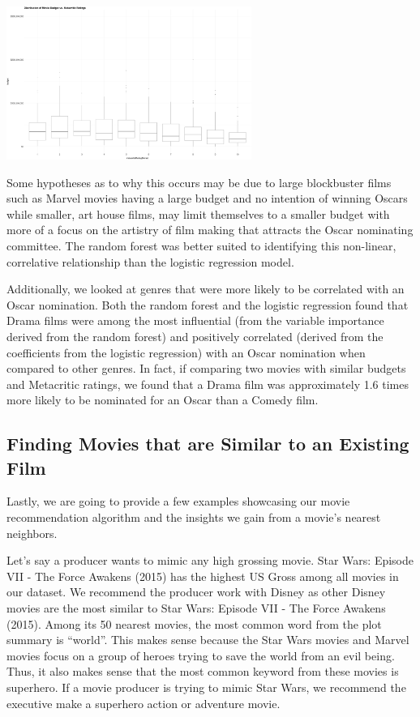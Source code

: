 \documentclass[10pt]{article}
\begin{document}
\begin{center}
\includegraphics[width=8cm]{_assets/_eda/eda__boxplot_budget_vs_metacritic_binned.png}
\end{center}

Some hypotheses as to why this occurs may be due to large blockbuster films such as Marvel movies having a large budget and no intention of winning Oscars while smaller, art house films, may limit themselves to a smaller budget with more of a focus on the artistry of film making that attracts the Oscar nominating committee. The random forest was better suited to identifying this non-linear, correlative relationship than the logistic regression model.

Additionally, we looked at genres that were more likely to be correlated with an Oscar nomination. Both the random forest and the logistic regression found that Drama films were among the most influential (from the variable importance derived from the random forest) and positively correlated (derived from the coefficients from the logistic regression) with an Oscar nomination when compared to other genres. In fact, if comparing two movies with similar budgets and Metacritic ratings, we found that a Drama film was approximately 1.6 times more likely to be nominated for an Oscar than a Comedy film.

\subsection{Finding Movies that are Similar to an Existing Film}

Lastly, we are going to provide a few examples showcasing our movie recommendation algorithm and the insights we gain from a movie’s nearest neighbors.  

Let’s say a producer wants to mimic any high grossing movie. Star Wars: Episode VII - The Force Awakens (2015) has the highest US Gross among all movies in our dataset. We recommend the producer work with Disney as other Disney movies are the most similar to Star Wars: Episode VII - The Force Awakens (2015). Among its 50 nearest movies, the most common word from the plot summary is “world”. This makes sense because the Star Wars movies and Marvel movies focus on a group of heroes trying to save the world from an evil being. Thus, it also makes sense that the most common keyword from these movies is superhero. If a movie producer is trying to mimic Star Wars, we recommend the executive make a superhero action or adventure movie. 
\end{document}
